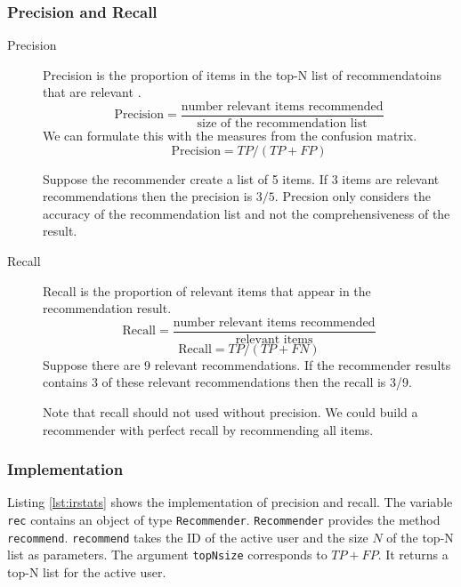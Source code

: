 \subsubsection{Precision and Recall}
\label{sec:precision}

\begin{description}
\item[Precision] Precision is the proportion of items in the top-N list of recommendatoins that are relevant \cite{Manning}.
  \begin{equation}
    \label{eq:precision}
    \text{Precision} = \frac{\text{number relevant items recommended}}{\text{size of the recommendation list}}
  \end{equation}
We can formulate this with the measures from the confusion matrix.
  \begin{equation}
    \label{eq:precisionm}
    \text{Precision} = TP/(TP+FP)
  \end{equation}

 Suppose the recommender create a list of 5 items. If 3 items are relevant recommendations then the precision is $3/5$. 
Precsion only considers the accuracy of the recommendation list and not the comprehensiveness of the result.

\item[Recall] Recall is the proportion of relevant items that appear in the recommendation result. 
  \begin{equation}
    \label{eq:recall}
    \text{Recall} = \frac{\text{number relevant items recommended}}{\text{relevant items}}
  \end{equation}
  \begin{equation}
    \label{eq:recallcm}
    \text{Recall} = TP/(TP+FN)
  \end{equation}
Suppose there are 9 relevant recommendations. If the recommender results contains 3 of these relevant recommendations then the recall is 3/9.

Note that recall should not used without precision. We could build a recommender with perfect recall by recommending all items.
\end{description}

\subsubsection{Implementation}
\label{sec:irimpl}

Listing \ref{lst:irstats} shows the implementation of precision and recall. 
The variable \verb|rec| contains an object of type \verb|Recommender|. \verb|Recommender| provides the method \verb|recommend|. \verb|recommend| takes the ID of the active user and the size $N$ of the top-N list as parameters. The argument \verb|topNsize| corresponds to $TP+FP$. It returns a top-N list for the active user. 

